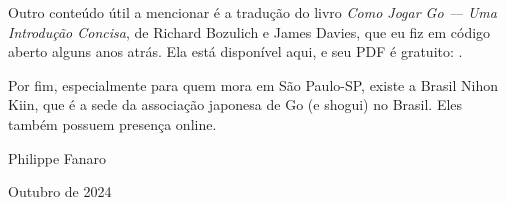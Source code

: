 Outro conteúdo útil a mencionar é a tradução do livro \emph{Como Jogar Go --- Uma Introdução Concisa}, de Richard Bozulich e James Davies, que eu fiz em código aberto alguns anos atrás. Ela está disponível aqui, e seu PDF é gratuito: .

Por fim, especialmente para quem mora em São Paulo-SP, existe a Brasil Nihon Kiin, que é a sede da associação japonesa de Go (e shogui) no Brasil. Eles também possuem presença online.

\bigskip
\smallskip
\smallskip
\smallskip

\hspace*{\fill} Philippe Fanaro \hspace{0.115cm}

\hspace*{\fill} Outubro de 2024 \hspace{0.115cm}